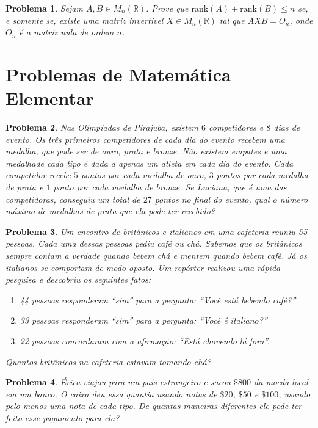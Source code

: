 \documentclass{hipatia}
\newtheorem{problem*}{Problema}
\begin{document}
\begin{problem*}
Sejam $A, B \in M_n(\mathbb{R})$. Prove que $\mbox{rank}(A) + \mbox{rank}(B) \leq n$ se, e somente se, existe uma matriz invertível $X \in M_n(\mathbb{R})$ tal que $AXB = O_n$, onde $O_n$ é a matriz nula de ordem $n$.
	
\end{problem*}

\section{Problemas de Matemática Elementar}

\begin{problem*}
Nas Olimpíadas de Pirajuba, existem $6$ competidores e $8$ dias de evento. Os três primeiros competidores de cada dia do evento recebem uma medalha, que pode ser de ouro, prata e bronze. Não existem empates e uma medalhade cada tipo é dada a apenas um atleta em cada dia do evento. Cada competidor recebe $5$ pontos por cada medalha de ouro, $3$ pontos por cada medalha de prata e $1$ ponto por cada medalha de bronze. Se Luciana, que é uma das competidoras, conseguiu um total de $27$ pontos no final do evento, qual o número máximo de medalhas de prata que ela pode ter recebido?
\end{problem*}

\begin{problem*}
Um encontro de britânicos e italianos em uma cafeteria reuniu 55 pessoas. Cada uma dessas pessoas pediu café ou chá. Sabemos que os britânicos sempre contam a verdade quando bebem chá e mentem quando bebem café. Já os italianos se comportam de modo oposto. Um repórter realizou uma rápida pesquisa e descobriu os seguintes fatos:
\begin{enumerate}
\item[1)] 44 pessoas responderam ``sim'' para a pergunta: ``Você está bebendo café?''
\item[2)] 33 pessoas responderam ``sim'' para a pergunta: ``Você é italiano?''
\item[3)] 22 pessoas concordaram com a afirmação: ``Está chovendo lá fora''.
\end{enumerate}

Quantos britânicos na cafeteria estavam tomando chá?
\end{problem*}

\begin{problem*}
Érica viajou para um país estrangeiro e sacou $\$800$ da moeda local em um banco. O caixa deu essa quantia usando notas de $\$20$, $\$50$ e $\$100$, usando pelo menos uma nota de cada tipo. De quantas maneiras diferentes ele pode ter feito esse pagamento para ela?
\end{problem*}
\end{document}
